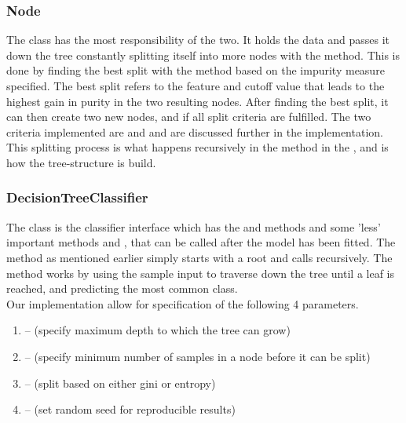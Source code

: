 \subsubsection{Node}
The  class has the most responsibility of the two.
It holds the data and passes it down the tree constantly splitting itself into more nodes with the  method.
This is done by finding the best split with the  method based on the impurity measure specified.
The best split refers to the feature and cutoff value that leads to the highest gain in purity in the two resulting nodes.
After finding the best split, it can then create two new nodes,  and  if all split criteria are fulfilled.
The two criteria implemented are  and  and are discussed further in the  implementation.
This splitting process is what happens recursively in the  method in the , and is how the tree-structure is build. \\

\subsubsection{DecisionTreeClassifier}
The  class is the classifier interface
which has the  and  methods and some 'less' important
methods  and , that can be called after the model has been fitted.
The  method as mentioned earlier simply starts with a root  and calls  recursively.
The  method works by using the sample input to traverse down the tree until a leaf is reached, and predicting the most common class.\\
Our implementation allow for specification of the following 4 parameters.\\
\begin{enumerate}[label=(\roman*)]
    \item {} -- (specify maximum depth to which the tree can grow)
    \item {} -- (specify minimum number of samples in a node before it can be split)
    \item {} -- (split based on either gini or entropy)
    \item {} -- (set random seed for reproducible results)
    \end{enumerate}
\vspace{10pt}

